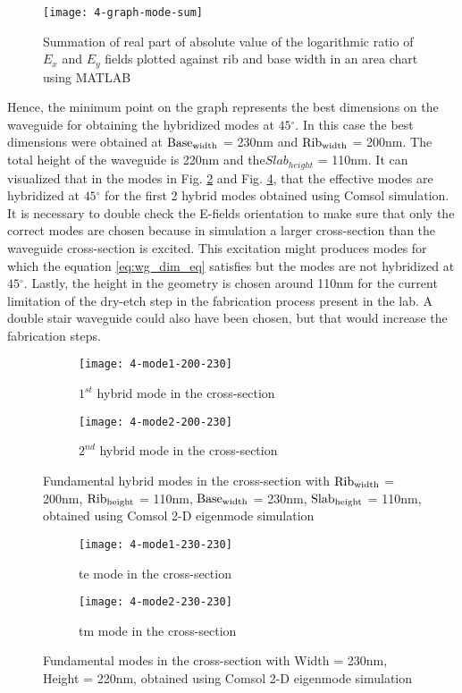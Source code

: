 \documentclass[../report.tex]{subfiles}
\begin{document}
\begin{figure}[H] %
	\centering
	\texttt{[image: 4-graph-mode-sum]}
	\caption{Summation of real part of absolute value of the logarithmic ratio of $E_x$ and $E_y$ fields plotted against rib and base width in an area chart using MATLAB}
	\label{fig:4_graph_mode_sum}
\end{figure}  
\noindent Hence, the minimum point on the graph represents the best dimensions on the waveguide for obtaining the hybridized modes at $45{^\circ}$. In this case the best dimensions were obtained at $\mathrm{Base_{width}}$ = 230nm and $\mathrm{Rib_{width}}$ = 200nm. The total height of the waveguide is 220nm and the$Slab_{height}$ = 110nm. It can visualized that in the modes in Fig. \ref{fig:4_mode1_200_230} and Fig. \ref{fig:4_mode2_200_230}, that the effective modes are hybridized at $45{^\circ}$ for the first 2 hybrid modes obtained using Comsol simulation. It is necessary to double check the E-fields orientation to make sure that only the correct modes are chosen because in simulation a larger cross-section than the waveguide cross-section is excited. This excitation might produces modes for which the equation \ref{eq:wg_dim_eq} satisfies but the modes are not hybridized at $45{^\circ}$. Lastly, the height in the geometry is chosen around 110nm for the current limitation of the dry-etch step in the fabrication process present in the lab. A double stair waveguide could also have been chosen, but that would increase the fabrication steps.
\begin{figure}[H] %
	\begin{subfigure}[t]{0.45\textwidth}
		\texttt{[image: 4-mode1-200-230]}
		\caption{$1^{st}$ hybrid mode in the cross-section}
		\label{fig:4_mode1_200_230}
	\end{subfigure}
	\hfill
	\begin{subfigure}[t]{0.45\textwidth}
		\texttt{[image: 4-mode2-200-230]}
		\caption{$2^{nd}$ hybrid mode in the cross-section}
		\label{fig:4_mode2_200_230}
	\end{subfigure}
	\caption{Fundamental hybrid modes in the cross-section with $\mathrm{Rib_{width}}$ = 200nm, $\mathrm{Rib_{height}}$ = 110nm, $\mathrm{Base_{width}}$ = 230nm, $\mathrm{Slab_{height}}$ = 110nm, obtained using Comsol 2-D eigenmode simulation}
\end{figure}

\begin{figure}[H] %
	\begin{subfigure}[t]{0.45\textwidth}
		\texttt{[image: 4-mode1-230-230]}
		\caption{\gls{te} mode in the cross-section}
		\label{fig:4_mode1_230_230}
	\end{subfigure}
	\hfill
	\begin{subfigure}[t]{0.45\textwidth}
		\texttt{[image: 4-mode2-230-230]}
		\caption{\gls{tm} mode in the cross-section}
		\label{fig:4_mode2_230_230}
	\end{subfigure}
	\caption{Fundamental modes in the cross-section with Width = 230nm, Height = 220nm, obtained using Comsol 2-D eigenmode simulation}
\end{figure}
\end{document}
